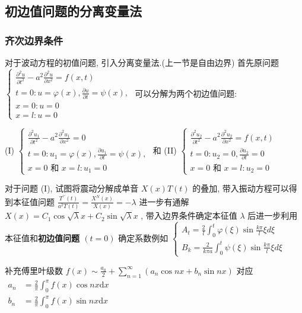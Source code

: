 \documentclass[10pt]{yerbaformat}
\begin{document}
\subsection{初边值问题的分离变量法}
\subsubsection{齐次边界条件}
\par 对于波动方程的初值问题, 引入分离变量法.(上一节是自由边界) 首先原问题 $\left\{\begin{array}{l}\frac{\partial^{2} u}{\partial t^{2}}-a^{2} \frac{\partial^{2} u}{\partial x^{2}}=f(x, t) \\ t=0: u=\varphi(x), \frac{\partial u}{\partial t}=\psi(x), \\ x=0: u=0 \\ x=l: u=0\end{array}\right.$ 可以分解为两个初边值问题:

(I) $\left\{\begin{array}{l}\frac{\partial^{2} u_{1}}{\partial t^{2}}-a^{2} \frac{\partial^{2} u_{1}}{\partial x^{2}}=0 \\ t=0: u_{1}=\varphi(x), \frac{\partial u_{1}}{\partial t}=\psi(x), \\ x=0 \text { 和 } x=l: u_{1}=0\end{array}\right.$
和 (II) $\left\{\begin{array}{l}\frac{\partial^{2} u_{2}}{\partial t^{2}}-a^{2} \frac{\partial^{2} u_{2}}{\partial x^{2}}=f(x, t) \\ t=0: u_{2}=0, \frac{\partial u_{2}}{\partial t}=0 \\ x=0 \text { 和 } x=l: u_{2}=0\end{array}\right.$

\par 对于问题 (I), 试图将震动分解成单音 $X(x) T(t)$ 的叠加, 带入振动方程可以得到本征值问题 $\frac{T^{\prime \prime}(t)}{a^{2} T(t)}=\frac{X^{N}(x)}{X(x)}=-\lambda$
进一步有通解 $X(x)=C_{1} \cos \sqrt{\lambda} x+C_{2} \sin \sqrt{\lambda} x$ , 带入边界条件确定本征值 $\lambda$ 后进一步利用本征值和\textbf{初边值问题 $(t=0)$ }确定系数例如 $\left\{\begin{array}{l}A_{t}=\frac{2}{l} \int_{0}^{t} \varphi(\xi) \sin \frac{k \pi}{l} \xi d \xi \\ B_{k}=\frac{2}{k \pi a} \int_{0}^{t} \psi(\xi) \sin \frac{k \pi}{l} \xi d \xi\end{array}\right.$

\par 补充傅里叶级数 $f(x) \sim \frac{a_{0}}{2}+\sum_{n=1}^{\infty}\left(a_{n} \cos n x+b_{n} \sin n x\right)$ 对应 $\begin{aligned} a_{n} &=\frac{2}{\pi} \int_{0}^{\pi} f(x) \cos n x \mathrm{d} x \\ b_{n} &=\frac{2}{\pi} \int_{0}^{\pi} f(x) \sin n x \mathrm{d} x \end{aligned}$
\end{document}
